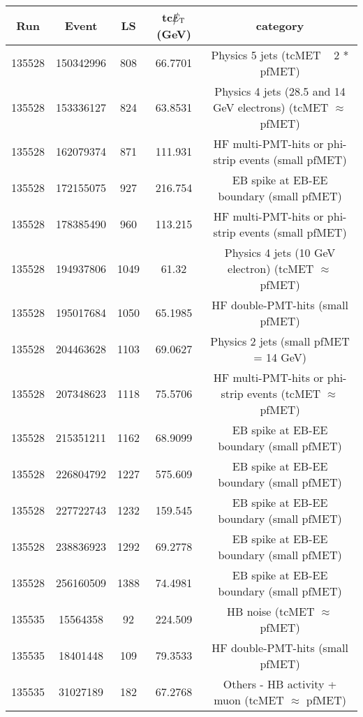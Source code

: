 \begin{table}[htbp]
  \begin{center}
    \begin{tabular}{|c|c|c|c|c|}
      \hline
      Run & Event & LS & tc$\big\slash\hspace{-1.6ex}{E_\text{T}}$ (GeV) & category \\     
      \hline
      135528  & 150342996    & 808  &    66.7701 & Physics 5 jets (tcMET ~ 2 * pfMET) \\
      135528  & 153336127    & 824  &    63.8531 & Physics 4 jets (28.5 and 14 GeV electrons) (tcMET $\approx$ pfMET) \\
      135528  & 162079374    & 871  &    111.931 & HF multi-PMT-hits or phi-strip events (small pfMET) \\
      135528  & 172155075    & 927  &    216.754 & EB spike at EB-EE boundary (small pfMET) \\
      135528  & 178385490    & 960  &    113.215 & HF multi-PMT-hits or phi-strip events (small pfMET) \\
      135528  & 194937806    & 1049 &    61.32   & Physics 4 jets (10 GeV electron) (tcMET $\approx$ pfMET) \\
      135528  & 195017684    & 1050 &    65.1985 & HF double-PMT-hits (small pfMET) \\
      135528  & 204463628    & 1103 &    69.0627 & Physics 2 jets (small pfMET =  14 GeV) \\
      135528  & 207348623    & 1118 &    75.5706 & HF multi-PMT-hits or phi-strip events (tcMET $\approx$ pfMET) \\ 
      135528  & 215351211    & 1162 &    68.9099 & EB spike at EB-EE boundary (small pfMET) \\
      135528  & 226804792    & 1227 &    575.609 & EB spike at EB-EE boundary (small pfMET) \\
      135528  & 227722743    & 1232 &    159.545 & EB spike at EB-EE boundary (small pfMET) \\
      135528  & 238836923    & 1292 &    69.2778 & EB spike at EB-EE boundary (small pfMET) \\
      135528  & 256160509    & 1388 &    74.4981 & EB spike at EB-EE boundary (small pfMET) \\
      135535  & 15564358     & 92   &    224.509 & HB noise (tcMET $\approx$ pfMET) \\
      135535  & 18401448     & 109  &    79.3533 & HF double-PMT-hits (small pfMET) \\
      135535  & 31027189     & 182  &    67.2768 & Others - HB activity + muon (tcMET $\approx$ pfMET) \\

\end{tabular}
\end{center}
\end{table}
